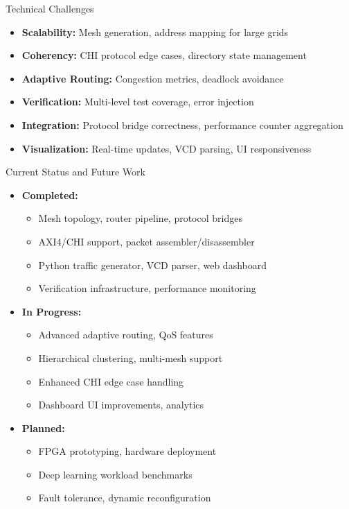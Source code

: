 \documentclass{beamer}
\begin{document}
\begin{frame}{Technical Challenges}
  \begin{itemize}
    \item \textbf{Scalability:} Mesh generation, address mapping for large grids
    \item \textbf{Coherency:} CHI protocol edge cases, directory state management
    \item \textbf{Adaptive Routing:} Congestion metrics, deadlock avoidance
    \item \textbf{Verification:} Multi-level test coverage, error injection
    \item \textbf{Integration:} Protocol bridge correctness, performance counter aggregation
    \item \textbf{Visualization:} Real-time updates, VCD parsing, UI responsiveness
  \end{itemize}
\end{frame}

\begin{frame}{Current Status and Future Work}
  \begin{itemize}
    \item \textbf{Completed:}
      \begin{itemize}
        \item Mesh topology, router pipeline, protocol bridges
        \item AXI4/CHI support, packet assembler/disassembler
        \item Python traffic generator, VCD parser, web dashboard
        \item Verification infrastructure, performance monitoring
      \end{itemize}
    \item \textbf{In Progress:}
      \begin{itemize}
        \item Advanced adaptive routing, QoS features
        \item Hierarchical clustering, multi-mesh support
        \item Enhanced CHI edge case handling
        \item Dashboard UI improvements, analytics
      \end{itemize}
    \item \textbf{Planned:}
      \begin{itemize}
        \item FPGA prototyping, hardware deployment
        \item Deep learning workload benchmarks
        \item Fault tolerance, dynamic reconfiguration
      \end{itemize}
  \end{itemize}
\end{frame}
\end{document}
